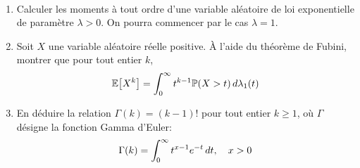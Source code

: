 \begin{td-exo}[]\, %
    \begin{enumerate}
        \item Calculer les moments à tout ordre d'une variable aléatoire
        de loi exponentielle de paramètre \(\lambda>0\). On pourra
        commencer par le cas \(\lambda=1\).

        \item Soit \(X\) une variable aléatoire réelle positive. À l'aide du
        théorème de Fubini, montrer que pour tout entier \(k\),
        \begin{equation*}
            \mathbb{E}\mathopen{}\left[X^k\right]\mathclose{} = \int_0^\infty t^{k-1} \mathbb{P}(X>t) \mathop{}\!{d}\lambda_1(t)
        \end{equation*}

        \item En déduire la relation \(\Gamma(k) = {(k-1)}!\) pour tout entier
        \(k\geq 1\), où \(\Gamma\) désigne la fonction Gamma d'Euler:
        \begin{equation*}
            \Gamma(k) = \int_0^\infty t^{x-1} e^{-t} \mathop{}\!{d} t, \quad x>0
        \end{equation*}
    \end{enumerate}
\end{td-exo}
